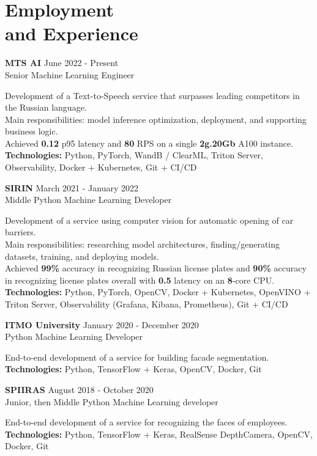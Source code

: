 \section{\sc Employment \\and Experience}
\vspace{2.6pt}

\textbf{MTS AI} \hfill June 2022 - Present \\
Senior Machine Learning Engineer

Development of a Text-to-Speech service that surpasses leading competitors in the Russian language. \\
Main responsibilities: model inference optimization, deployment, and supporting business logic. \\
Achieved \textbf{0.12} p95 latency and \textbf{80} RPS on a single \textbf{2g.20Gb} A100 instance. \\
\textbf{Technologies:} Python, PyTorch, WandB / ClearML, Triton Server, Observability, Docker + Kubernetes, Git + CI/CD

\textbf{SIRIN} \hfill March 2021 - January 2022 \\
Middle Python Machine Learning Developer

Development of a service using computer vision for automatic opening of car barriers. \\
Main responsibilities: researching model architectures, finding/generating datasets, training, and deploying models. \\
Achieved \textbf{99\%} accuracy in recognizing Russian license plates and \textbf{90\%} accuracy in recognizing license plates overall with \textbf{0.5} latency on an \textbf{8}-core CPU. \\
\textbf{Technologies:} Python, PyTorch, OpenCV, Docker + Kubernetes, OpenVINO + Triton Server, Observability (Grafana, Kibana, Prometheus), Git + CI/CD

\textbf{ITMO University} \hfill January 2020 - December 2020 \\
Python Machine Learning Developer

End-to-end development of a service for building facade segmentation. \\
\textbf{Technologies:} Python, TensorFlow + Keras, OpenCV, Docker, Git

\textbf{SPIIRAS} \hfill August 2018 - October 2020 \\
Junior, then Middle Python Machine Learning developer

End-to-end development of a service for recognizing the faces of employees. \\
\textbf{Technologies:} Python, TensorFlow + Keras, RealSense DepthCamera, OpenCV, Docker, Git

\endinput
